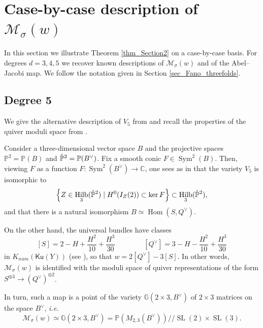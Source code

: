 \documentclass[11pt]{amsart}
\theoremstyle{definition}
\newcommand{\C}{\mathbb{C}}
\newcommand{\pr}[1]{\mathbb P^{#1}}
\DeclareMathOperator{\SL}{SL}
\DeclareMathOperator{\Hom}{Hom}
\DeclareMathOperator{\Sym}{Sym}
\DeclareMathOperator{\Hilb}{Hilb}
\newcommand{\sM}{\mathcal{M}}
\newcommand{\AAA}[1]{\textcolor{red}{#1}}
\newcommand{\Ku}{\mathsf{Ku}}
\begin{document}
\section{Case-by-case description of $\sM_\sigma(w)$}\label{sec_higher_degrees}
\label{sec_d=2}

In this section we illustrate Theorem \ref{thm_Section2} on a case-by-case basis. For degrees $d=3,4,5$ we recover known descriptions of $\sM_\sigma(w)$ and of the Abel--Jacobi map. We follow the notation given in Section \ref{sec_Fano_threefolds}.

\subsection{Degree 5}





We give the alternative description of $V_5$ from \cite{Fae05} and recall the properties of the quiver moduli space from \cite{Dre88}.

Consider a three-dimensional vector space $B$ and the projective spaces $\pr 2= \mathbb P(B)$ and $\Check{\mathbb{P}}^2=\mathbb{P}(B^\vee)$. Fix a smooth conic $F\in \Sym^2 (B)$.
Then, viewing $F$ as a function $F\colon \Sym^2(B^\vee)\to \C$, one sees as in \cite[Lemma 2.3]{Fae05} that the variety $V_5$ is isomorphic to
\begin{equation}\label{eq_locus_in_hilb}
     \left\lbrace Z\in \Hilb_3(\Check{\mathbb{P}}^2) \mid H^0(I_Z(2))\subset \ker F\right\rbrace \subset \Hilb_3(\Check{\mathbb{P}}^2), 
\end{equation} 
and that there is a natural isomorphism $B\simeq \Hom(S,Q^\vee)$.

On the other hand, the universal bundles %
 have classes
\[ [S]=2-H +\frac{H^2}{10} +\frac{H^3}{30} \qquad\qquad [Q^\vee]=3-H-\frac{H^2}{10}+\frac{H^3}{30} \]
in $K_{num}(\Ku(Y))$ (see \cite[Section~3]{Fae05}), so that $w=2[Q^\vee]-3[S]$. In other words, $\sM_\sigma(w)$ is identified with the moduli space of quiver representations of the form $S^{\oplus 3}\rightarrow (Q^{\vee})^{\oplus 2}$.

In turn, such a map is a point of the variety $\mathbb G (2\times 3,B^\vee)$ of $2\times 3$ matrices on the space $B^\vee$, \textit{i.e.}
\[\sM_\sigma(w) \simeq \mathbb G (2\times 3,B^\vee)= \mathbb P(M_{2,3}(B^\vee))// \SL(2)\times \SL(3).\]
\end{document}
